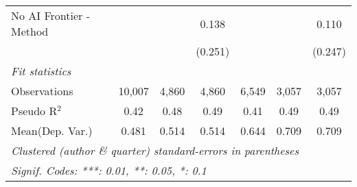 \begin{tabular}{lcccccc}
   No AI Frontier - Method &               &         & 0.138         &              &              & 0.110\\   
                           &               &         & (0.251)       &              &              & (0.247)\\   
   \midrule
   \emph{Fit statistics}\\
   Observations            & 10,007        & 4,860   & 4,860         & 6,549        & 3,057        & 3,057\\  
   Pseudo R$^2$            & 0.42          & 0.48    & 0.49          & 0.41         & 0.49         & 0.49\\  
Mean(Dep. Var.) & 0.481 & 0.514 & 0.514 & 0.644 & 0.709 & 0.709 \\
   \midrule \midrule
   \multicolumn{7}{l}{\emph{Clustered (author \& quarter) standard-errors in parentheses}}\\
   \multicolumn{7}{l}{\emph{Signif. Codes: ***: 0.01, **: 0.05, *: 0.1}}\\
\end{tabular}
\par\endgroup
